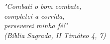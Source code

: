 \begin{epigrafe}
    \vspace*{\fill}
	\begin{flushright}
		
		\textit{"Combati o bom combate, \\
		completei a corrida, \\
		perseverei minha fé!" \\
		(Bíblia Sagrada, II Timóteo 4, 7)}
	\end{flushright}
\end{epigrafe}
  